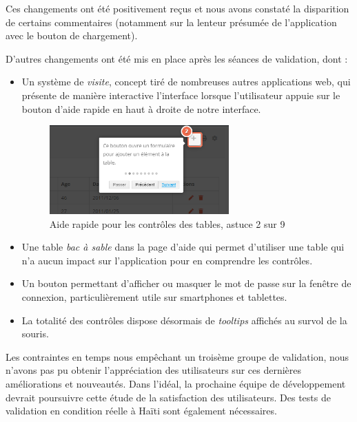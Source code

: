 \documentclass{EPL-master-thesis-covers-FR}
\begin{document}
				Ces changements ont été positivement reçus et nous avons constaté la disparition de certains commentaires (notamment sur la lenteur présumée de l'application avec le bouton de chargement).

				D'autres changements ont été mis en place après les séances de validation, dont :
				\begin{itemize}
					\item Un système de \emph{visite}, concept tiré de nombreuses autres applications web, qui présente de manière interactive l'interface lorsque l'utilisateur appuie sur le bouton d'aide rapide en haut à droite de notre interface.
						\begin{figure}[H]
							\centering
							\includegraphics[width=0.65\textwidth]{images/screen_sandbox_table_quick_help.png}
							\caption{Aide rapide pour les contrôles des tables, astuce 2 sur 9}
							\label{fig:screen_sandbox_quick_help}
						\end{figure}
					\item Une table \emph{bac à sable} dans la page d'aide qui permet d'utiliser une table qui n'a aucun impact sur l'application pour en comprendre les contrôles.
					\item Un bouton permettant d'afficher ou masquer le mot de passe sur la fenêtre de connexion, particulièrement utile sur smartphones et tablettes.
					\item La totalité des contrôles dispose désormais de \emph{tooltips} affichés au survol de la souris.
				\end{itemize}

				Les contraintes en temps nous empêchant un troisème groupe de validation, nous n'avons pas pu obtenir l'appréciation des utilisateurs sur ces dernières améliorations et nouveautés. Dans l'idéal, la prochaine équipe de développement devrait poursuivre cette étude de la satisfaction des utilisateurs. Des tests de validation en condition réelle à Haïti sont également nécessaires.
\end{document}
